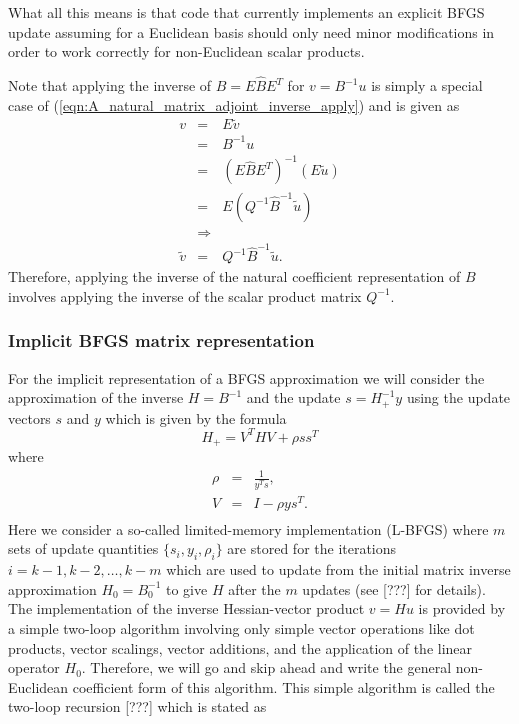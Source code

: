 What all this means is that code that currently implements an explicit BFGS
update assuming for a Euclidean basis should only need minor modifications in
order to work correctly for non-Euclidean scalar products.

Note that applying the inverse of $B = E {}\hat{B} E^T$ for $v = B^{-1} u$
is simply a special case of (\ref{eqn:A_natural_matrix_adjoint_inverse_apply})
and is given as
%
\begin{eqnarray}
v
& = & E \tilde{v} \nonumber \\
& = & B^{-1} u \nonumber \\
& = & (E \hat{B} E^T)^{-1} (E \tilde{u}) \nonumber \\
& = & E ( Q^{-1} \hat{B}^{-1} \tilde{u}) \nonumber \\
& \Rightarrow &  \nonumber \\
\tilde{v} & = & Q^{-1} \hat{B}^{-1} \tilde{u}.
\label{eqn:B_inverse}
\end{eqnarray}
%
Therefore, applying the inverse of the natural coefficient representation of
$B$ involves applying the inverse of the scalar product matrix $Q^{-1}$.

\subsubsection*{Implicit BFGS matrix representation}

For the implicit representation of a BFGS approximation we will consider the
approximation of the inverse $H = B^{-1}$ and the update $s = H_+^{-1} y$
using the update vectors $s$ and $y$ which is given by the formula
%
\begin{equation}
H_+ = V^T H V + \rho s s^T
\end{equation}
%
where
\begin{eqnarray}
\rho & = & \frac{1}{y^T s}, \\
V & = & I - \rho y s^T. \\
\end{eqnarray}
Here we consider a so-called limited-memory implementation (L-BFGS) where $m$
sets of update quantities $\{s_i,y_i,\rho_i\}$ are stored for the iterations
$i = k-1, k-2, {}\ldots, k-m$ which are used to update from the initial matrix
inverse approximation $H_0 = B_0^{-1}$ to give $H$ after the $m$ updates (see
[???] for details).  The implementation of the inverse Hessian-vector product
$v = H u$ is provided by a simple two-loop algorithm involving only simple
vector operations like dot products, vector scalings, vector additions, and
the application of the linear operator $H_0$.  Therefore, we will go and skip
ahead and write the general non-Euclidean coefficient form of this algorithm.
This simple algorithm is called the two-loop recursion [???] which is stated
as

